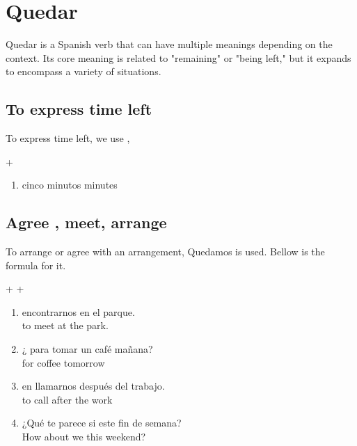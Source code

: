 \documentclass[grid,avery5371]{article}
\begin{document}
\section{Quedar}
Quedar is a Spanish verb that can have multiple meanings depending on the context. Its core meaning is related to "remaining" or "being left," but it expands to encompass a variety of situations.
\\
\subsection{To express time left}
To express time left, we use ,\\

\begin{center}  +  \end{center}
\begin{enumerate}
    \item {} cinco minutos  minutes  \\
\end{enumerate}

\subsection{Agree , meet, arrange}
To arrange or agree with an arrangement, Quedamos is used. Bellow is the formula for it. 
\begin{center}  + + \end{center}

\begin{enumerate}
    \item {} encontrarnos en el parque.\dotfill \\
    \dotfill {} to meet at the park.\\
    \item ¿ para tomar un café mañana? \dotfill \\
     for coffee tomorrow \\
    \item {} en llamarnos después del trabajo. \dotfill \\
     to call after the work\\
    \item ¿Qué te parece si  este fin de semana? \dotfill \\How about we  this weekend?
\end{enumerate}
\end{document}
